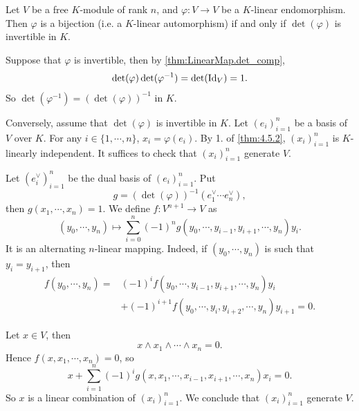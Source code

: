 \begin{theoremenv}
    Let $V$ be a free $K$-module of rank $n$, and $\varphi : V\rightarrow V$ be a $K$-linear endomorphism.
    Then $\varphi$ is a bijection (i.e. a $K$-linear automorphism) if and only if $\det (\varphi)$ is invertible in $K$.
\end{theoremenv}
\begin{proofenv}
    Suppose that $\varphi$ is invertible, then by \ref{thm:LinearMap.det_comp}, 
    $$ \det (\varphi) \det (\varphi^{-1}) = \det (\operatorname{\mathrm{Id}}_V) = 1.$$
    So $\det (\varphi^{-1}) = \left(\det (\varphi)\right)^{-1}$ in $K$.

    \quad Conversely, assume that $\det (\varphi)$ is invertible in $K$. Let $(e_i)_{i=1}^n$ be a basis of $V$ over $K$.
    For any $i \in \{1,\cdots,n\}$, $x_i = \varphi(e_i)$.
    By 1. of \ref{thm:4.5.2}, $\left(x_i\right)_{i=1}^{n}$ is $K$-linearly independent.
    It suffices to check that $\left(x_i\right)_{i=1}^{n}$ generate $V$.

    \quad Let $\left(e_i^\vee\right)_{i=1}^{n}$ be the dual basis of $\left(e_i\right)_{i=1}^{n}$.
    Put
    $$ g = \left(\det (\varphi)\right)^{-1} \left(e_1^\vee \cdots e_{n}^{\vee}\right),$$
    then $g(x_1, \cdots, x_n) = 1$.
    We define $f: V^{n+1} \rightarrow V$ as 
    $$ \left(y_0,\cdots, y_n\right) \longmapsto \sum_{i=0}^{n}(-1)^n g(y_0, \cdots, y_{i-1}, y_{i+1}, \cdots, y_n) y_i.$$
    It is an alternating $n$-linear mapping.
    Indeed, if $(y_0,\cdots, y_n)$ is such that $y_i = y_{i+1}$, then 
    $$\begin{aligned}
        f(y_0,\cdots,y_n) = & (-1)^{i} f(y_0,\cdots,y_{i-1}, y_{i+1}, \cdots, y_n) y_i\\
        & + (-1)^{i+1} f(y_0,\cdots,y_{i}, y_{i+2}, \cdots, y_n) y_{i+1} = 0.
    \end{aligned}$$
    \begin{center}
    \end{center}
    Let $x\in V$, then
    $$ x\wedge x_1 \wedge \cdots \wedge x_n = 0.$$
    Hence $f(x,x_1,\cdots,x_n) = 0$, so 
    $$ x + \sum_{i=1}^{n} (-1)^{i} g\left(x,x_1,\cdots,x_{i-1},x_{i+1},\cdots,x_n\right)x_i = 0.$$ 
    So $x$ is a linear combination of $\left(x_i\right)_{i=1}^{n}$.
    We conclude that $\left(x_i\right)_{i=1}^{n}$ generate $V$.
\end{proofenv}

